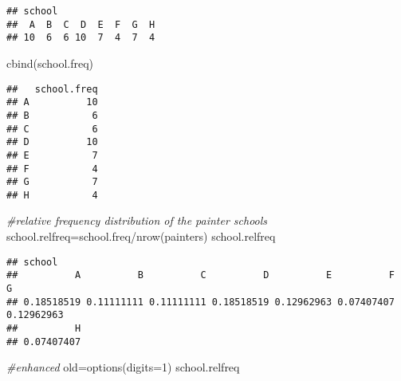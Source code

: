 \documentclass[
]{article}
\newenvironment{Shaded}{\begin{snugshade}}{\end{snugshade}}
\newcommand{\AttributeTok}[1]{\textcolor[rgb]{0.77,0.63,0.00}{#1}}
\newcommand{\CommentTok}[1]{\textcolor[rgb]{0.56,0.35,0.01}{\textit{#1}}}
\newcommand{\DecValTok}[1]{\textcolor[rgb]{0.00,0.00,0.81}{#1}}
\newcommand{\FunctionTok}[1]{\textcolor[rgb]{0.00,0.00,0.00}{#1}}
\newcommand{\NormalTok}[1]{#1}
\newcommand{\OtherTok}[1]{\textcolor[rgb]{0.56,0.35,0.01}{#1}}
\newcommand{\SpecialCharTok}[1]{\textcolor[rgb]{0.00,0.00,0.00}{#1}}
\begin{document}
\begin{Shaded}
\end{Shaded}

\begin{verbatim}
## school
##  A  B  C  D  E  F  G  H 
## 10  6  6 10  7  4  7  4
\end{verbatim}

\begin{Shaded}
\begin{Highlighting}[]
\FunctionTok{cbind}\NormalTok{(school.freq)}
\end{Highlighting}
\end{Shaded}

\begin{verbatim}
##   school.freq
## A          10
## B           6
## C           6
## D          10
## E           7
## F           4
## G           7
## H           4
\end{verbatim}

\begin{Shaded}
\begin{Highlighting}[]
\CommentTok{\#relative frequency distribution of the painter schools}
\NormalTok{school.relfreq}\OtherTok{=}\NormalTok{school.freq}\SpecialCharTok{/}\FunctionTok{nrow}\NormalTok{(painters)}
\NormalTok{school.relfreq}
\end{Highlighting}
\end{Shaded}

\begin{verbatim}
## school
##          A          B          C          D          E          F          G 
## 0.18518519 0.11111111 0.11111111 0.18518519 0.12962963 0.07407407 0.12962963 
##          H 
## 0.07407407
\end{verbatim}

\begin{Shaded}
\begin{Highlighting}[]
\CommentTok{\#enhanced}
\NormalTok{old}\OtherTok{=}\FunctionTok{options}\NormalTok{(}\AttributeTok{digits=}\DecValTok{1}\NormalTok{)}
\NormalTok{school.relfreq}
\end{Highlighting}
\end{Shaded}
\end{document}
